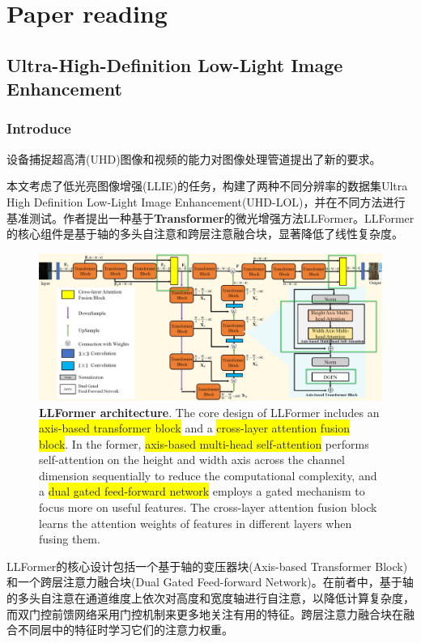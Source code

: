 \documentclass[letterpaper,10pt]{article}
\begin{document}
	
	\section{Paper reading}
	
	\subsection{Ultra-High-Definition Low-Light Image Enhancement}
	
	\subsubsection{Introduce}
	
	设备捕捉超高清(UHD)图像和视频的能力对图像处理管道提出了新的要求。
	
	本文考虑了低光亮图像增强(LLIE)的任务，构建了两种不同分辨率的数据集Ultra High Definition Low-Light Image Enhancement(UHD-LOL)，并在不同方法进行基准测试。作者提出一种基于\textbf{Transformer}的微光增强方法LLFormer。LLFormer的核心组件是基于轴的多头自注意和跨层注意融合块，显著降低了线性复杂度。
	
	\begin{figure}[htbp]
		\centering 
		\includegraphics[width=\columnwidth]{picture/LLFormer_architecture}
		\captionsetup{font=scriptsize}
		\caption{
			\label{fig: LLFormer architecture} %
			\textbf{LLFormer architecture}. The core design of LLFormer includes an \colorbox{yellow}{axis-based transformer block} and a \colorbox{yellow}{cross-layer attention fusion block}. In the former, \colorbox{yellow}{axis-based multi-head self-attention} performs self-attention on the height and width axis across the channel dimension sequentially to reduce the computational complexity, and a \colorbox{yellow}{dual gated feed-forward network} employs a gated mechanism to focus more on useful features. The cross-layer attention fusion block learns the attention weights of features in different layers when fusing them.
			}
	\end{figure}
	LLFormer的核心设计包括一个基于轴的变压器块(Axis-based Transformer Block)和一个跨层注意力融合块(Dual Gated Feed-forward Network)。在前者中，基于轴的多头自注意在通道维度上依次对高度和宽度轴进行自注意，以降低计算复杂度，而双门控前馈网络采用门控机制来更多地关注有用的特征。跨层注意力融合块在融合不同层中的特征时学习它们的注意力权重。
	
\end{document}
